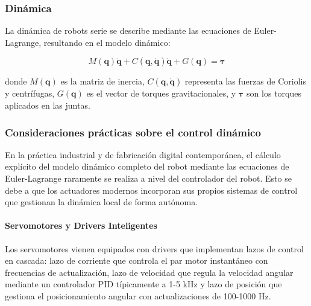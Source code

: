


\subsubsection{Dinámica}

La dinámica de robots serie se describe mediante las ecuaciones de Euler-Lagrange, resultando en el modelo dinámico:

\begin{equation}
M(\mathbf{q})\ddot{\mathbf{q}} + C(\mathbf{q}, \dot{\mathbf{q}})\dot{\mathbf{q}} + G(\mathbf{q}) = \boldsymbol{\tau}
\end{equation}

donde $M(\mathbf{q})$ es la matriz de inercia, $C(\mathbf{q}, \dot{\mathbf{q}})$ representa las fuerzas de Coriolis y centrífugas, $G(\mathbf{q})$ es el vector de torques gravitacionales, y $\boldsymbol{\tau}$ son los torques aplicados en las juntas.

\subsubsection{Consideraciones prácticas sobre el control dinámico}

En la práctica industrial y de fabricación digital contemporánea, el cálculo explícito del modelo dinámico completo del robot mediante las ecuaciones de Euler-Lagrange raramente se realiza a nivel del controlador del robot. Esto se debe a que los actuadores modernos incorporan sus propios sistemas de control que gestionan la dinámica local de forma autónoma.

\paragraph{Servomotores y Drivers Inteligentes}

Los servomotores vienen equipados con drivers que implementan lazos de control en cascada: lazo de corriente que controla el par motor instantáneo con frecuencias de actualización, lazo de velocidad que regula la velocidad angular mediante un controlador PID típicamente a 1-5 kHz y lazo de posición que gestiona el posicionamiento angular con actualizaciones de 100-1000 Hz.

